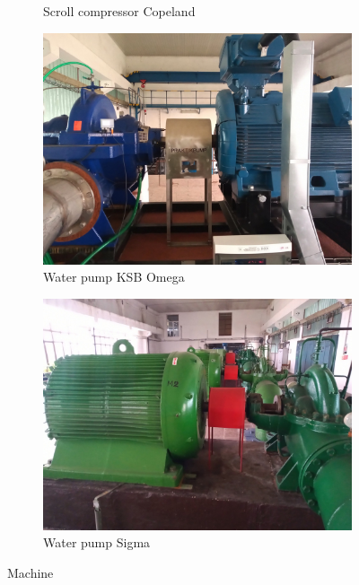 \begin{figure}[ht]
\begin{subfigure}[b]{0.49\textwidth}
        \caption{Scroll compressor Copeland}
    \end{subfigure}
    \begin{subfigure}[b]{0.49\textwidth}
    		\centering
        \includegraphics[width=\textwidth]{assets/design/machine-ksb-pump.jpg}
        \caption{Water pump KSB Omega}
    \end{subfigure}
    \hfill
    \begin{subfigure}[b]{0.49\textwidth}
    		\centering
        \includegraphics[width=\textwidth]{assets/design/machine-sigma-pump.jpg}
        \caption{Water pump Sigma}
    \end{subfigure}
    \caption{Machine}
\end{figure}


